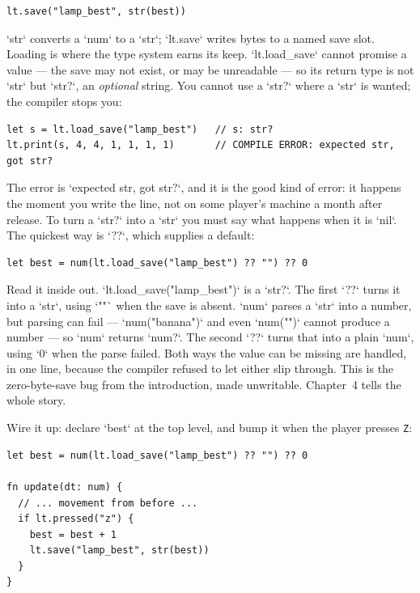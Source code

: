 \begin{lstlisting}[language=wick]
lt.save("lamp_best", str(best))
\end{lstlisting}

\noindent
`str` converts a `num` to a `str`; `lt.save` writes bytes to a named save
slot. Loading is where the type system earns its keep. `lt.load_save` cannot
promise a value --- the save may not exist, or may be unreadable --- so its
return type is not `str` but `str?`, an \emph{optional} string. You cannot
use a `str?` where a `str` is wanted; the compiler stops you:

\begin{lstlisting}[language=wick]
let s = lt.load_save("lamp_best")   // s: str?
lt.print(s, 4, 4, 1, 1, 1, 1)       // COMPILE ERROR: expected str, got str?
\end{lstlisting}

\noindent
The error is `expected str, got str?`, and it is the good kind of error: it
happens the moment you write the line, not on some player's machine a month
after release. To turn a `str?` into a `str` you must say what happens when
it is `nil`. The quickest way is `??`, which supplies a default:

\begin{lstlisting}[language=wick]
let best = num(lt.load_save("lamp_best") ?? "") ?? 0
\end{lstlisting}

\noindent
Read it inside out. `lt.load_save("lamp_best")` is a `str?`. The first `??`
turns it into a `str`, using `""` when the save is absent. `num` parses a
`str` into a number, but parsing can fail --- `num("banana")` and even
`num("")` cannot produce a number --- so `num` returns `num?`. The second `??`
turns that into a plain `num`, using `0` when the parse failed. Both ways the
value can be missing are handled, in one line, because the compiler refused
to let either slip through. This is the zero-byte-save bug from the
introduction, made unwritable. Chapter~4 tells the whole story.

Wire it up: declare `best` at the top level, and bump it when the player
presses \texttt{Z}:

\begin{lstlisting}[language=wick]
let best = num(lt.load_save("lamp_best") ?? "") ?? 0

fn update(dt: num) {
  // ... movement from before ...
  if lt.pressed("z") {
    best = best + 1
    lt.save("lamp_best", str(best))
  }
}
\end{lstlisting}

